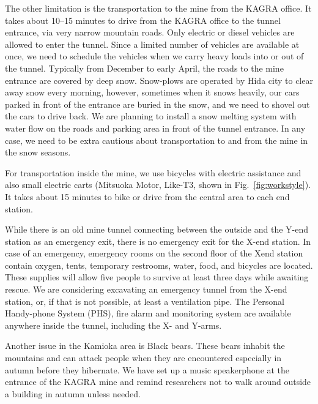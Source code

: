 \documentclass[prd ,twocolumn ,secnumarabic,dvips
,amssymb, amsmath,nobibnotes, aps, prd,superscriptaddress]{revtex4-1}
\begin{document}
{%
The other limitation is the transportation to the mine from the KAGRA office. It takes about 10--15 minutes to drive from the KAGRA office to the tunnel entrance, via very narrow mountain roads. Only electric or diesel vehicles are allowed to enter the tunnel.  
Since a limited number of vehicles are available at once, we need to schedule the vehicles when we carry heavy loads into or out of the tunnel. 
Typically from December to early April, the roads to the mine entrance are covered by deep snow.
Snow-plows are operated by Hida city to clear away snow every morning, however, sometimes when it snows heavily, our cars parked in front of the entrance are buried in the snow, and we need to shovel out the cars to drive back. We are planning to install a snow melting system with water flow on the roads and parking area in front of the tunnel entrance.
In any case, we need to be extra cautious about transportation to and from the mine in the snow seasons.

For transportation inside the mine, we use bicycles with electric assistance and also small electric carts (Mitsuoka Motor, Like-T3, shown in Fig.~\ref{fig:workstyle}). It takes about 15 minutes to bike or drive from the central area to each end station. 

While there is an old mine tunnel connecting between the outside and the Y-end station as an emergency exit, there is no emergency exit for the X-end station. In case of an emergency, emergency rooms on the second floor of the Xend station contain oxygen, tents, temporary restrooms, water, food, and bicycles are located.  These supplies will allow five people to survive at least three days while awaiting rescue. We are considering excavating an emergency tunnel from the X-end station, or, if that is not possible, at least a ventilation pipe. The Personal Handy-phone System (PHS), fire alarm and monitoring system are available anywhere inside the tunnel, including the X- and Y-arms.

Another issue in the Kamioka area is Black bears. These bears inhabit the mountains and can attack people when they are encountered especially in autumn before they hibernate. We have set up a music speakerphone at the entrance of the KAGRA mine and remind researchers not to walk around outside a building in autumn unless needed.


}
\end{document}

